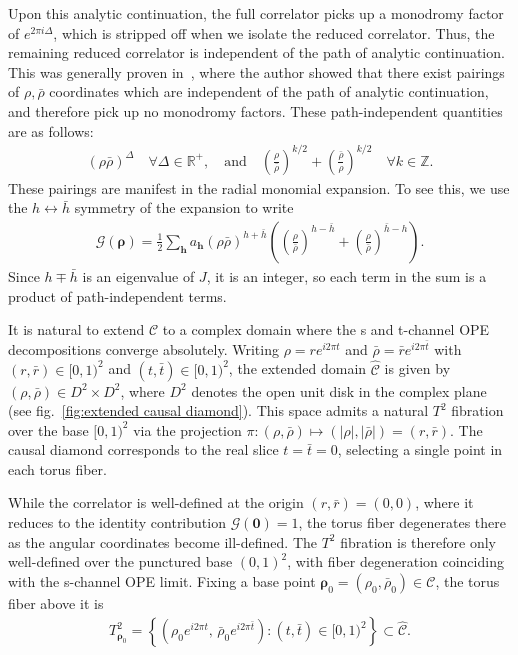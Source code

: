 \documentclass[a4paper,11pt]{article}
\theoremstyle{plain}
\theoremstyle{definition}
\theoremstyle{remark}
\newcommand{\bs}[1]{\boldsymbol{#1}}
\newcommand{\bh}{{\bar{h}}}
\newcommand{\rhob}{{\bar{\rho}}}
\newcommand{\ba}{\begin{equation} \begin{aligned}}
\newcommand{\ea}{\end{aligned} \end{equation}}
\newcommand{\De}{\Delta}
\begin{document}
Upon this analytic continuation, the full correlator picks up a monodromy factor of $e^{2 \pi i \De}$, which is stripped off when we isolate the reduced correlator. Thus, the remaining reduced correlator is independent of the path of analytic continuation. This was generally proven in~\cite{Qiao:2020bcs}, where the author showed that there exist pairings of $\rho,\bar{\rho}$ coordinates which are independent of the path of analytic continuation, and therefore pick up no monodromy factors. These path-independent quantities are as follows:
\ba\label{eq:path-ind}
(\rho \rhob)^\De \quad \forall \De \in \mathbb{R}^+ , \quad \text{and} \quad \left(\frac{\rho}{\rhob} \right)^{k/2} + \left(\frac{\rhob}{\rho} \right)^{k/2} \quad \forall k \in \mathbb{Z}.
\ea
These pairings are manifest in the radial monomial expansion. To see this, we use the $h \leftrightarrow \bh$ symmetry of the expansion to write
\ba
\mathcal{G}(\bs{\rho})= \frac{1}{2}\sum_{\bs{h}} a_{\bs{h}} (\rho \bar{\rho})^{h+\bh} \left( \left(\frac{\rho}{\rhob} \right)^{h-\bh}+\left(\frac{\rho}{\rhob} \right)^{\bh-h}  \right).
\ea
Since $h \mp \bh$ is an eigenvalue of $J$, it is an integer, so each term in the sum is a product of path-independent terms.
 
It is natural to extend $\mathscr{C}$ to a complex domain where the s and t-channel OPE decompositions converge absolutely. Writing $\rho = r e^{i2\pi t}$ and $\bar{\rho} = \bar{r} e^{i2\pi\bar{t}}$ with $(r, \bar{r}) \in [0,1)^2$ and $(t, \bar{t}) \in [0,1)^2$, the extended domain $\widehat{\mathscr{C}}$ is given by $(\rho, \bar{\rho}) \in D^2 \times D^2$, where $D^2$ denotes the open unit disk in the complex plane (see fig.~\ref{fig:extended causal diamond}). This space admits a natural $T^2$ fibration over the base $[0,1)^2$ via the projection $\pi: (\rho, \bar{\rho}) \mapsto (|\rho|, |\bar{\rho}|) = (r,\bar{r})$. The causal diamond corresponds to the real slice $t = \bar{t} = 0$, selecting a single point in each torus fiber. 

While the correlator is well-defined at the origin $(r, \bar{r}) = (0,0)$, where it reduces to the identity contribution $\mathcal{G}(\bs{0}) = 1$, the torus fiber degenerates there as the angular coordinates become ill-defined. The $T^2$ fibration is therefore only well-defined over the punctured base $(0,1)^2$, with fiber degeneration coinciding with the s-channel OPE limit. Fixing a base point $\bs{\rho}_0 = (\rho_0, \bar{\rho}_0) \in \mathscr{C}$, the torus fiber above it is
\ba
T^2_{\bs{\rho}_0} = \left\{ \left(\rho_0 e^{i2\pi t},\, \bar{\rho}_0 e^{i2\pi \bar{t}}\right) : (t, \bar{t}) \in [0,1)^2 \right\} \subset \widehat{\mathscr{C}}.
\ea
 
\end{document}
